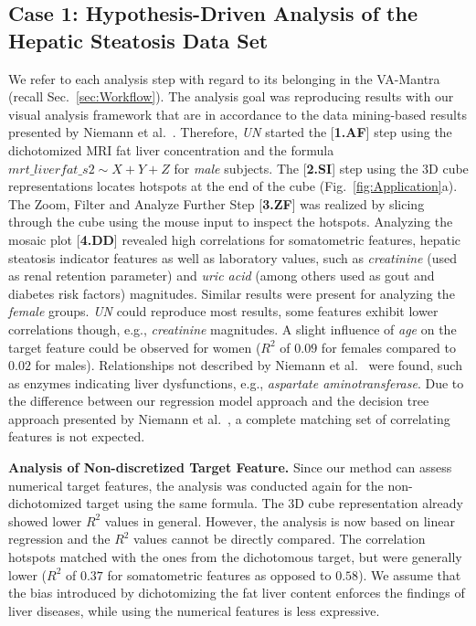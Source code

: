 \documentclass[journal]{style/vgtc} 			          %
\begin{document}
\subsection{Case 1: Hypothesis-Driven Analysis of the Hepatic Steatosis Data Set}
We refer to each analysis step with regard to its belonging in the VA-Mantra (recall Sec.~\ref{sec:Workflow}).
The analysis goal was reproducing results with our visual analysis framework that are in accordance to the data mining-based results presented by Niemann et al.~\cite{Niemann2014}.
Therefore, \emph{UN} started the [\textbf{1.AF}] step using the dichotomized MRI fat liver concentration and the formula $mrt\_liverfat\_s2 \sim X + Y + Z$ for \emph{male} subjects.
The [\textbf{2.SI}] step using the 3D cube representations locates hotspots at the end of the cube (Fig.~\ref{fig:Application}a).
The Zoom, Filter and Analyze Further Step [\textbf{3.ZF}] was realized by slicing through the cube using the mouse input to inspect the hotspots.
Analyzing the mosaic plot [\textbf{4.DD}] revealed high correlations for somatometric features, hepatic steatosis indicator features as well as laboratory values, such as \emph{creatinine} (used as renal retention parameter) and \emph{uric acid} (among others used as gout and diabetes risk factors) magnitudes.
Similar results were present for analyzing the \emph{female} groups.
\emph{UN} could reproduce most results, some features exhibit lower correlations though, e.g., \emph{creatinine} magnitudes.
A slight influence of \emph{age} on the target feature could be observed for women ($R^2$ of $0.09$ for females compared to $0.02$ for males).
Relationships not described by Niemann et al.~\cite{Niemann2014} were found, such as enzymes indicating liver dysfunctions, e.g., \emph{aspartate aminotransferase}.
%
Due to the difference between our regression model approach and the decision tree approach presented by Niemann et al.~\cite{Niemann2014}, a complete matching set of correlating features is not expected.

\textbf{Analysis of Non-discretized Target Feature.}
Since our method can assess numerical target features, the analysis was conducted again for the non-dichotomized target using the same formula.
The 3D cube representation already showed lower $R^2$ values in general.
However, the analysis is now based on linear regression and the $R^2$ values cannot be directly compared.
The correlation hotspots matched with the ones from the dichotomous target, but were generally lower ($R^2$ of $0.37$ for somatometric features as opposed to $0.58$).
We assume that the bias introduced by dichotomizing the fat liver content enforces the findings of liver diseases, while using the numerical features is less expressive.
\end{document}
